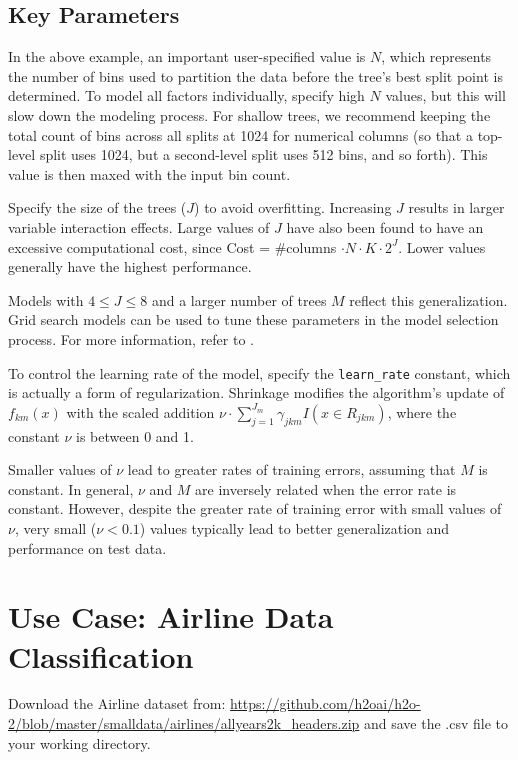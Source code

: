 \subsection{Key Parameters}
\label{ssec:Key parameters}
\raggedbottom
In the above example, an important user-specified value is $N$, which represents the number of bins used to partition the data before the tree's best split point is determined. To model all factors individually, specify high $N$ values, but this will slow down the modeling process. For shallow trees, we recommend keeping the total count of bins across all splits at 1024  for numerical columns (so that a top-level split uses 1024, but a second-level split uses 512 bins, and so forth). This value is then maxed with the input bin count.

Specify the size of the trees ($J$) to avoid overfitting. Increasing $J$ results in larger variable interaction effects. Large values of $J$ have also been found to have an excessive computational cost,
since Cost = \#columns $\cdot N \cdot K \cdot 2^{J}$. Lower values generally have the highest
performance. 

Models with $4 \leq J \leq 8$ and a larger number of trees $M$ reflect this generalization.
Grid search models can be used to tune these parameters in the model selection process. For more information, refer to . 

To control the learning rate of the model, specify the \texttt{learn\_rate} constant, which is actually a
form of regularization. Shrinkage modifies the algorithm's update of $f_{km}(x)$ with the scaled
addition $\nu \cdot \sum_{j=1}^{J_m} \gamma_{jkm} I(x \in R_{jkm})$, where the constant $\nu$ is between 0 and 1. 

Smaller values of $\nu$ lead to greater rates of training errors, assuming that $M$ is constant. In general, $\nu$ and $M$ are inversely related when the error rate is  constant. However, despite the greater rate of training error with small values of $\nu$, very small ($\nu < 0.1$) values typically lead to better generalization and performance on test data.


\section{Use Case: Airline Data Classification}
Download the Airline dataset from: {\url{https://github.com/h2oai/h2o-2/blob/master/smalldata/airlines/allyears2k_headers.zip}} and save the .csv file to your working directory. 

